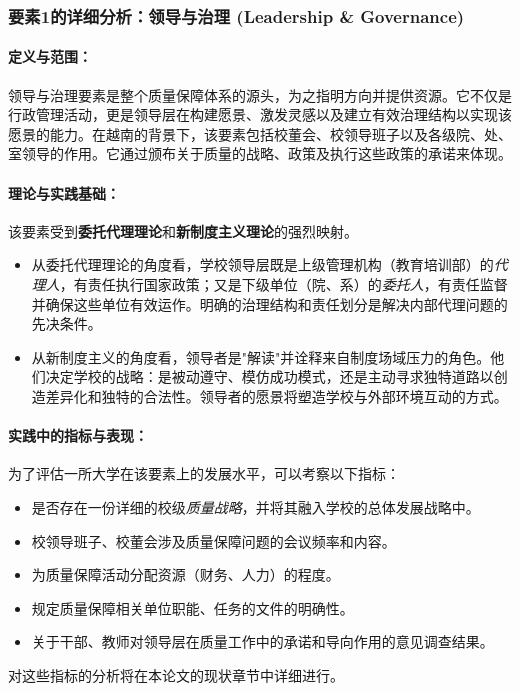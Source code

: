 \subsubsection{要素1的详细分析：领导与治理 (Leadership \& Governance)}
\label{subsubsec:thanh_to_1}

\paragraph{定义与范围：}
领导与治理要素是整个质量保障体系的源头，为之指明方向并提供资源。它不仅是行政管理活动，更是领导层在构建愿景、激发灵感以及建立有效治理结构以实现该愿景的能力。在越南的背景下，该要素包括校董会、校领导班子以及各级院、处、室领导的作用。它通过颁布关于质量的战略、政策及执行这些政策的承诺来体现。

\paragraph{理论与实践基础：}
该要素受到\textbf{委托代理理论}和\textbf{新制度主义理论}的强烈映射。
\begin{itemize}
    \item 从委托代理理论的角度看，学校领导层既是上级管理机构（教育培训部）的\textit{代理人}，有责任执行国家政策；又是下级单位（院、系）的\textit{委托人}，有责任监督并确保这些单位有效运作。明确的治理结构和责任划分是解决内部代理问题的先决条件。
    \item 从新制度主义的角度看，领导者是"解读"并诠释来自制度场域压力的角色。他们决定学校的战略：是被动遵守、模仿成功模式，还是主动寻求独特道路以创造差异化和独特的合法性。领导者的愿景将塑造学校与外部环境互动的方式。
\end{itemize}

\paragraph{实践中的指标与表现：}
为了评估一所大学在该要素上的发展水平，可以考察以下指标：
\begin{itemize}
    \item 是否存在一份详细的校级\textit{质量战略}，并将其融入学校的总体发展战略中。
    \item 校领导班子、校董会涉及质量保障问题的会议频率和内容。
    \item 为质量保障活动分配资源（财务、人力）的程度。
    \item 规定质量保障相关单位职能、任务的文件的明确性。
    \item 关于干部、教师对领导层在质量工作中的承诺和导向作用的意见调查结果。
\end{itemize}
对这些指标的分析将在本论文的现状章节中详细进行。

